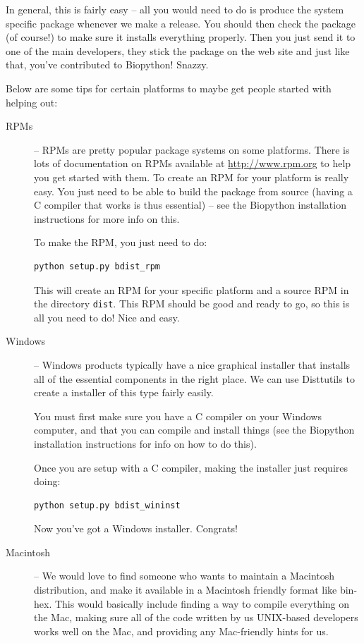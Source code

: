 \documentclass{report}
\begin{document}
In general, this is fairly easy -- all you would need to do is produce the system specific package whenever we make a release. You should then check the package (of course!) to make sure it installs everything properly. Then you just send it to one of the main developers, they stick the package on the web site and just like that, you've contributed to Biopython! Snazzy.


Below are some tips for certain platforms to maybe get people started with helping out:

\begin{description}
  \item[RPMs] -- RPMs are pretty popular package systems on some platforms. There is lots of documentation on RPMs available at \url{http://www.rpm.org} to help you get started with them. To create an RPM for your platform is really easy. You just need to be able to build the package from source (having a C compiler that works is thus essential) -- see the Biopython installation instructions for more info on this.


To make the RPM, you just need to do:

\begin{verbatim}
python setup.py bdist_rpm
\end{verbatim}

This will create an RPM for your specific platform and a source RPM in the directory \verb|dist|. This RPM should be good and ready to go, so this is all you need to do! Nice and easy.

\item[Windows] -- Windows products typically have a nice graphical installer that installs all of the essential components in the right place. We can use Disttutils to create a installer of this type fairly easily.


You must first make sure you have a C compiler on your Windows computer, and that you can compile and install things (see the Biopython installation instructions for info on how to do this).


Once you are setup with a C compiler, making the installer just requires doing:

\begin{verbatim}
python setup.py bdist_wininst
\end{verbatim}

Now you've got a Windows installer. Congrats!

\item[Macintosh] -- We would love to find someone who wants to maintain a Macintosh distribution, and make it available in a Macintosh friendly format like bin-hex. This would basically include finding a way to compile everything on the Mac, making sure all of the code written by us UNIX-based developers works well on the Mac, and providing any Mac-friendly hints for us.

\end{description}
\end{document}
